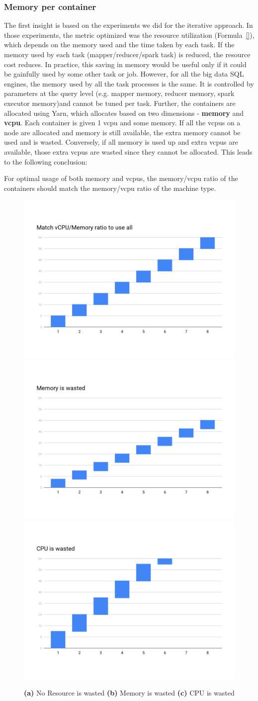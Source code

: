 \noindent\subsubsection*{Memory per container}
The first insight is based on the experiments we did for the iterative approach. In those experiments, the metric optimized was the resource utilization (Formula~\ref{}), which depends on the memory used and the time taken by each task. If the memory used by each task (mapper/reducer/spark task) is reduced, the resource cost reduces. In practice, this saving in memory would be useful only if it could be gainfully used by some other task or job. However, for all the big data SQL engines, the memory used by all the task processes is the same. It is controlled by parameters at the query level (e.g. mapper memory, reducer memory, spark executor memory)and cannot be tuned per task. Further, the containers are allocated using Yarn, which allocates based on two dimensions - \textbf{memory} and \textbf{vcpu}. Each container is given 1 vcpu and some memory. If all the vcpus on a node are allocated and memory is still available, the extra memory cannot be used and is wasted. Conversely, if all memory is used up and extra vcpus are available, those extra vcpus are wasted since they cannot be allocated. This leads to the following conclusion:
\begin{insight}
	For optimal usage of both memory and vcpus, the memory/vcpu ratio of the containers should match the memory/vcpu ratio of the machine type.
\end{insight}

\begin{figure}[h]
	\includegraphics[width=0.3\linewidth]{container_shape1.png} 
	\includegraphics[width=0.3\linewidth]{container_shape2.png}
	\includegraphics[width=0.3\linewidth]{container_shape3.png}
	\caption{\textbf{(a)} No Resource is wasted \textbf{(b)} Memory is wasted \textbf{(c)} CPU is wasted}
	\label{fig:container_shape}
\end{figure}


